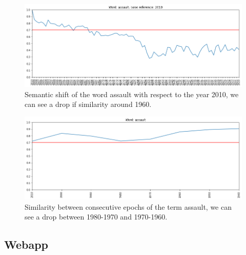\begin{figure}
\includegraphics[width=\textwidth]{images/semantic_1.png}
\caption{Semantic shift of the word assault 
with respect to the year 2010, we can see a drop if similarity around 1960.} \label{fig1}
\end{figure}
\begin{figure}
\includegraphics[width=\textwidth]{images/semantic_2.png}
\caption{Similarity between consecutive epochs of the term assault, we can see a 
drop between 1980-1970 and 1970-1960.} \label{fig2}
\end{figure}
\subsection{Webapp}